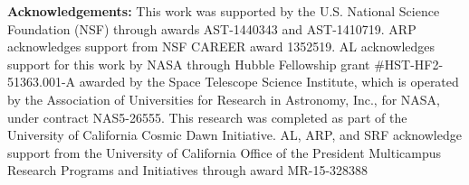 \documentclass[twocolumn]{emulateapj}
\begin{document}
    {\bf Acknowledgements:}  
This work was supported by the U.S. National Science Foundation (NSF) through awards AST-1440343 and AST-1410719.
ARP acknowledges support from NSF CAREER award 1352519.
AL acknowledges support for this work by NASA through Hubble Fellowship grant \#HST-HF2-51363.001-A awarded by the Space Telescope Science Institute, which is operated by the Association of Universities for Research in Astronomy, Inc., for NASA, under contract NAS5-26555.
This research was completed as part of the University of California Cosmic Dawn Initiative. AL, ARP, and SRF acknowledge support from the University of California Office of the President Multicampus Research Programs and Initiatives through award MR-15-328388

    
    {}
    
    
\end{document}
